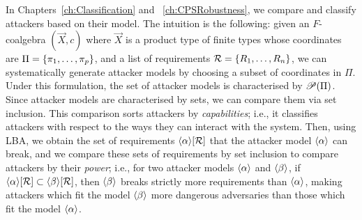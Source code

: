 \begin{example}
    

\end{example}

In Chapters~\ref{ch:Classification} and ~\ref{ch:CPSRobustness}, we compare and classify attackers based on their model. The intuition is the following: given an $F$-coalgebra $(\vec{X},c)$ where $\vec{X}$ is a product type of finite types whose coordinates are $\Pi=\left\{\pi_1,\ldots,\pi_p\right\}$, and a list of requirements $\mathcal{R}=\left\{R_1, \ldots, R_n\right\}$, we can systematically generate attacker models by choosing a subset of coordinates in $\Pi$. Under this formulation, the set of attacker models is characterised by ${{\mathscr{P}}\!\left({\Pi}\right)}$. Since attacker models are characterised by sets, we can compare them via set inclusion. This comparison sorts attackers by \emph{capabilities}; i.e., it classifies attackers with respect to the ways they can interact with the system. Then, using LBA, we obtain the set of requirements ${{\left<\alpha\right>}}[\mathcal{R}]$ that the attacker model ${{\left<\alpha\right>}}$ can break, and we compare these sets of requirements by set inclusion to compare attackers by their \emph{power}; i.e., for two attacker models ${{\left<\alpha\right>}}$ and ${{\left<\beta\right>}}$, if ${{\left<\alpha\right>}}[\mathcal{R}]\subset {{\left<\beta\right>}}[\mathcal{R}]$, then ${{\left<\beta\right>}}$ breaks strictly more requirements than ${{\left<\alpha\right>}}$, making attackers which fit the model ${{\left<\beta\right>}}$ more dangerous adversaries than those which fit the model ${{\left<\alpha\right>}}$.%

